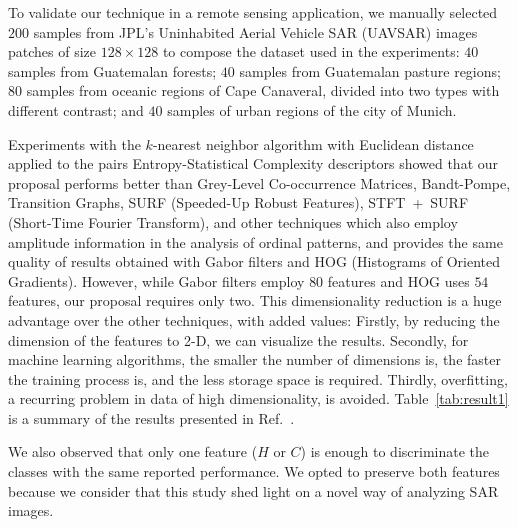 \documentclass[a4,11pt]{pssbmac}
\begin{document}
	To validate our technique in a remote sensing application, we manually selected $200$ samples from JPL's Uninhabited Aerial Vehicle SAR (UAVSAR) images patches of size $128 \times 128$ to compose the dataset used in the experiments:
	$40$ samples from Guatemalan forests;
	$40$ samples from Guatemalan pasture regions;
	$80$ samples from oceanic regions of Cape Canaveral, divided into two types with different contrast; and
	$40$ samples of urban regions of the city of Munich.
	
	Experiments with the $k$-nearest neighbor algorithm with Euclidean distance applied to the pairs Entropy-Statistical Complexity descriptors showed that our proposal performs better than Grey-Level Co-occurrence Matrices, Bandt-Pompe, Transition Graphs, SURF (Speeded-Up Robust Features), \mbox{STFT + SURF} (Short-Time Fourier Transform), and other techniques which also employ amplitude information in the analysis of ordinal patterns, and provides the same quality of results obtained with Gabor filters and HOG (Histograms of Oriented Gradients).
	However, while Gabor filters employ $80$ features and HOG uses $54$ features, our proposal requires only two.
	This dimensionality reduction is a huge advantage over the other techniques, with added values:
	Firstly, by reducing the dimension of the features to \mbox{2-D}, we can visualize the results.
	Secondly, for machine learning algorithms, the smaller the number of dimensions is, the faster the training process is, and the less storage space is required.
	Thirdly, overfitting, a recurring problem in data of high dimensionality, is avoided.
	Table~\ref{tab:result1} is a summary of the results presented in Ref.~\cite{AnalysisandClassificationofSARTexturesUsingInformationTheory}.
	
	
	We also observed that only one feature ($H$ or $C$) is enough to discriminate the classes with the same reported performance. 
	We opted to preserve both features because we consider that this study shed light on a novel way of analyzing SAR images. 
	
\end{document}
